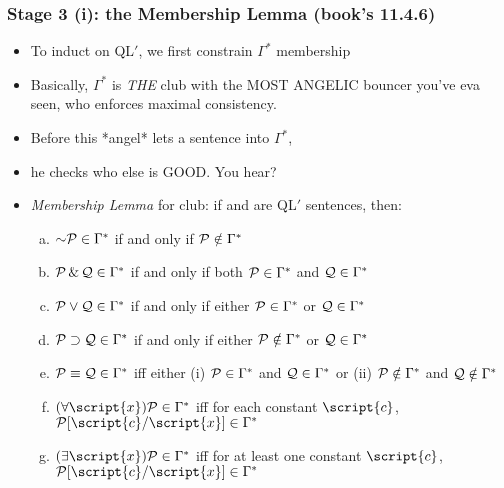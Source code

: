 \begin{frame}
\frametitle{Stage 3 (i): the Membership Lemma (book's 11.4.6)}

\begin{itemize}[<+->]

\item To induct on QL$'$, we first constrain $\Gamma^{\ast}$ membership

\item Basically, $\Gamma^{\ast}$ is \textit{THE} club with the MOST ANGELIC bouncer you've eva seen, who enforces maximal consistency. \item[] Before this *angel* lets a sentence into $\Gamma^{\ast}$, 
\item[] he checks who else is GOOD. You hear? 

\item \emph{Membership Lemma} for club: if  and  are QL$'$ sentences, then:

\begin{enumerate}[a.)]

\item $\enot \metav{P} \in \Gamma^{\ast}$ if and only if $\mathcal{P} \notin \Gamma^{\ast}$

\item $\mathcal{P} \,\&\, \mathcal{Q} \in \Gamma^{\ast}$ if and only if both $\mathcal{P}\in \Gamma^{\ast}$ and $\mathcal{Q}\in \Gamma^{\ast}$

\item $\mathcal{P} \vee \mathcal{Q} \in \Gamma^{\ast}$ if and only if either $\mathcal{P}\in \Gamma^{\ast}$ or $\mathcal{Q}\in \Gamma^{\ast}$

\item $\mathcal{P} \supset \mathcal{Q} \in \Gamma^{\ast}$ if and only if either $\mathcal{P}\notin \Gamma^{\ast}$ or $\mathcal{Q}\in \Gamma^{\ast}$

\item $\mathcal{P} \equiv \mathcal{Q} \in \Gamma^{\ast}$ iff either (i) $\mathcal{P}\in \Gamma^{\ast}$ and $\mathcal{Q}\in \Gamma^{\ast}$ or (ii) $\mathcal{P}\notin \Gamma^{\ast}$ and $\mathcal{Q}\notin \Gamma^{\ast}$

\item \emph{$\qt{\forall}{\script{x}} \metav{P} \in \Gamma^{\ast}$} iff for each constant $\script{c}$, $\metav{P}\substitute{\script{x}}{\script{c}} \in \Gamma^{\ast}$

\item  \emph{$\qt{\exists}{\script{x}} \metav{P} \in \Gamma^{\ast}$} iff for at least one constant $\script{c}$, $\metav{P}\substitute{\script{x}}{\script{c}} \in \Gamma^{\ast}$


\end{enumerate}
\end{itemize}
\end{frame}
